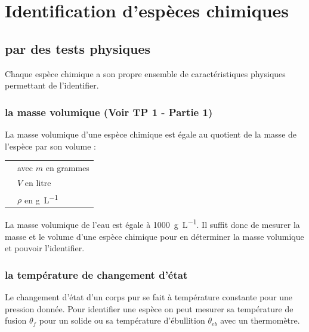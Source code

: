 \documentclass[a4paper,11pt,fleqn]{article}%
\begin{document}
\section{Identification d'espèces chimiques}
	\subsection{par des tests physiques}
Chaque espèce chimique a son propre ensemble de caractéristiques physiques permettant de
l’identifier.
		\subsubsection{la masse volumique (Voir TP 1 - Partie 1)}
La masse volumique d’une espèce chimique est égale au quotient de la masse de l’espèce par
son volume :\\
\begin{tabular}{>{\centering}m{6cm}|m{13cm}}
	\multirow{3}{*}{$\rho = \dfrac{m}{V}$} & avec $m$ en grammes\\
	& $V$ en litre\\
	& $\rho$ en \unit{\gram\per\liter}\\
\end{tabular}
La masse volumique de l’eau est égale à \SI{1000}{\gram\per\liter}. Il suffit donc de mesurer la masse et le volume d’une espèce chimique pour en déterminer la masse volumique et pouvoir l’identifier.
		\subsubsection{la température de changement d'état}
Le changement d’état d’un corps pur se fait à température constante pour une pression donnée.
Pour identifier une espèce on peut mesurer sa température de fusion $\theta_f$ pour un solide ou sa température d’ébullition $\theta_{eb}$ avec un thermomètre.
\end{document}
